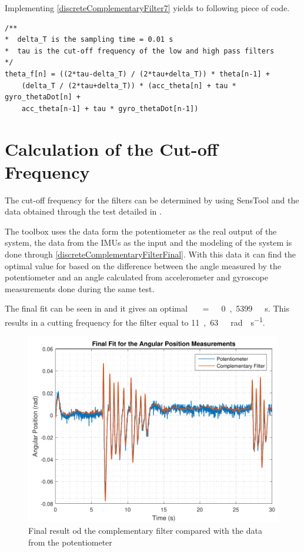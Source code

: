 Implementing \eqref{discreteComplementaryFilter7} yields to following piece of code. 
%
\begin{lstlisting}[caption  = {Code for the implementation of the complementary filter in C\texttt{++}},
label    = codeCompFilter ]
/**
*  delta_T is the sampling time = 0.01 s
*  tau is the cut-off frequency of the low and high pass filters
*/
theta_f[n] = ((2*tau-delta_T) / (2*tau+delta_T)) * theta[n-1] + 
	(delta_T / (2*tau+delta_T)) * (acc_theta[n] + tau * gyro_thetaDot[n] + 
	acc_theta[n-1] + tau * gyro_thetaDot[n-1]) 
\end{lstlisting}

\section{Calculation of the Cut-off Frequency}
The cut-off frequency for the filters can be determined by using SensTool and the data obtained through the test detailed in . 

The toolbox uses the data form the potentiometer as the real output of the system, the data from the IMUs as the input and the modeling of the system is done through \eqref{discreteComplementaryFilterFinal}. With this data it can find the optimal value for \si{\tau} based on the difference between the angle measured by the potentiometer and an angle calculated from accelerometer and gyroscope measurements done during the same test.

The final fit can be seen in  and it gives an optimal \si{\tau\ =\ 0,5399\ s}. This results in a cutting frequency for the filter equal to \si{11,63\ rad \cdot s^{-1}}.
%
\begin{figure}[H]
	\centering
	\includegraphics[scale=0.65]{figures/filterSensTool}
	\caption{Final result od the complementary filter compared with the data from the potentiometer}
	\label{filterSensTool}
\end{figure}\vspace{-5mm}
%